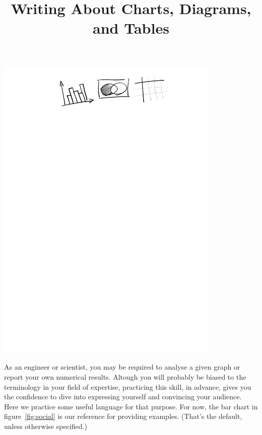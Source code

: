 \documentclass{article}
\begin{document}
\title{Writing About Charts, Diagrams, and Tables}
\date{}
\maketitle
\begin{center}
	\includegraphics[trim = 5cm 25cm 4cm 1cm, clip, width=0.8\textwidth]{diagrams.pdf}
\end{center}
As an engineer or scientist, you may be required to analyse a given graph or report your own numerical results. Altough you will probably be biased to the terminology in your field of expertise, practicing this skill, in advance, gives you the confidence to dive into expressing yourself and convincing your audience. Here we practice some useful language for that purpose. For now, the bar chart in figure~\ref{fig:social} is our reference for providing examples. (That's the default, unless otherwise specified.)
\end{document}
